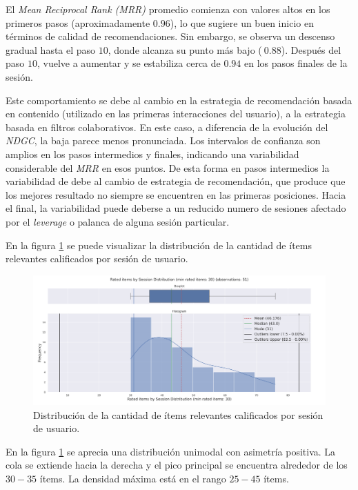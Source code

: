 \documentclass[11pt,a4paper,twoside]{thesis}
\begin{document}
El \textit{Mean Reciprocal Rank (MRR)} promedio comienza con valores altos en los primeros pasos (aproximadamente $0.96$), lo que sugiere un buen inicio en términos de calidad de recomendaciones. Sin embargo, se observa un descenso gradual hasta el paso $10$, donde alcanza su punto más bajo ($~0.88$). Después del paso $10$, vuelve a aumentar y se estabiliza cerca de $0.94$ en los pasos finales de la sesión.

Este comportamiento se debe al cambio en la estrategia de recomendación basada en contenido (utilizado en las primeras interacciones del usuario), a la estrategia basada en filtros colaborativos. En este caso, a diferencia de la evolución del \textit{NDGC}, la baja parece menos pronunciada. Los intervalos de confianza son amplios en los pasos intermedios y finales, indicando una variabilidad considerable del \textit{MRR} en esos puntos. De esta forma en pasos intermedios la variabilidad de debe al cambio de estrategia de recomendación, que produce que los mejores resultado no siempre se encuentren en las primeras posiciones. Hacia el final, la variabilidad puede deberse a un reducido numero de sesiones afectado por el \textit{leverage} o palanca de alguna sesión particular.


\clearpage

En la figura \ref{fig:llama2-rated_items_by_session_distribution} se puede visualizar la distribución de la cantidad de ítems relevantes calificados por sesión de usuario.

\begin{figure}[H]
	\centering
	\includegraphics[width=15cm]{./images/llama2/rated_items_by_session_distribution.png}
	\caption{Distribución de la cantidad de ítems relevantes calificados por sesión de usuario.}
	\label{fig:llama2-rated_items_by_session_distribution}
\end{figure}

En la figura \ref{fig:llama2-rated_items_by_session_distribution}  se aprecia  una distribución unimodal con asimetría positiva. La cola se extiende hacia la derecha y el pico principal se encuentra alrededor de los $30-35$ ítems. La densidad máxima está en el rango $25-45$ ítems.
\end{document}
